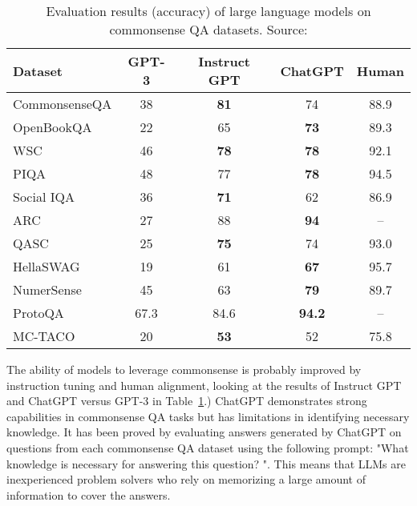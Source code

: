 \begin{table}[h!]
	\centering
	\small
	\begin{tabular}{|l|c|c|c|c|}
		\hline
		Dataset       & GPT-3 & Instruct GPT & ChatGPT       & Human \\
		\hline
		CommonsenseQA & 38    & \textbf{81}  & 74            & 88.9  \\
		OpenBookQA    & 22    & 65           & \textbf{73}   & 89.3  \\
		WSC           & 46    & \textbf{78}  & \textbf{78}   & 92.1  \\
		PIQA          & 48    & 77           & \textbf{78}   & 94.5  \\
		Social IQA    & 36    & \textbf{71}  & 62            & 86.9  \\
		ARC           & 27    & 88           & \textbf{94}   & --    \\
		QASC          & 25    & \textbf{75}  & 74            & 93.0  \\
		HellaSWAG     & 19    & 61           & \textbf{67}   & 95.7  \\
		NumerSense    & 45    & 63           & \textbf{79}   & 89.7  \\
		ProtoQA       & 67.3  & 84.6         & \textbf{94.2} & --    \\
		MC-TACO       & 20    & \textbf{53}  & 52            & 75.8  \\
		\hline
	\end{tabular}
	\caption{Evaluation results (accuracy) of large language models on commonsense QA datasets. Source: \textcite{bian2024chatgpt}}
	\label{tab:commonsense-results}
\end{table}
The ability of models to leverage commonsense is probably improved by instruction tuning and human alignment, looking at the results of Instruct GPT and ChatGPT versus GPT-3 in Table~\ref{tab:commonsense-results}.)
ChatGPT demonstrates strong capabilities in commonsense QA tasks but has limitations in identifying necessary knowledge.
It has been proved by evaluating answers generated by ChatGPT on questions from each commonsense QA dataset using the following prompt: "What knowledge is necessary for answering this question? ".
This means that LLMs are inexperienced problem solvers who rely on memorizing a large amount of information to cover the answers.

